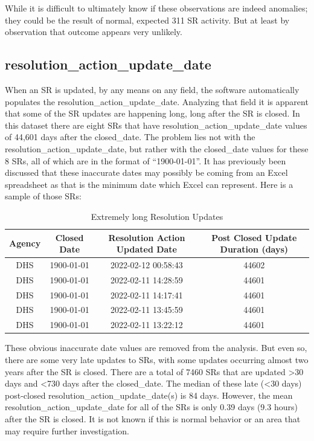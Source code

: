 \documentclass[12pt, titlepage]{article}
\begin{document}
	While it is difficult to ultimately know if these observations 
	are indeed anomalies; they could be the result of normal, 
	expected 311 SR activity. But at least by observation that 
	outcome appears very unlikely.	
		
\subsection{resolution\_action\_update\_date}
\label{sec: resolutionaction}
	When an SR is updated, by any means on any field, the software 
	automatically populates the resolution\_action\_update\_date. 
	Analyzing that field it is apparent that some of the SR updates 
	are happening long, long after the SR is closed. In this dataset 
	there are eight SRs that have resolution\_action\_update\_date values 
	of 44,601 days after the closed\_date. The problem lies not with 
	the  resolution\_action\_update\_date, but rather with the closed\_date 
	values for these 8 SRs, all of which are in the format of ``1900-01-01''. 
	It has previously been discussed that these inaccurate dates may 
	possibly be coming from an Excel spreadsheet as that is the minimum 
	date which Excel can represent. Here is a sample of those SRs:

	\begin{table}[tbp]
	    \centering
	    \caption{Extremely long Resolution Updates}
		    \begin{tabular}{cccc}
		        \hline
		        Agency & Closed Date & Resolution Action Updated Date 
		        & Post Closed Update Duration (days) \\
		        \hline
		        DHS & 1900-01-01 & 2022-02-12 00:58:43 & 44602 \\
		        DHS & 1900-01-01 & 2022-02-11 14:28:59 & 44601 \\
		        DHS & 1900-01-01 & 2022-02-11 14:17:41 & 44601 \\
		        DHS & 1900-01-01 & 2022-02-11 13:45:59 & 44601 \\
		        DHS & 1900-01-01 & 2022-02-11 13:22:12 & 44601 \\
		        \hline
		    \end{tabular}
	    \label{tab:resolution-updates}
	\end{table}
	
	These obvious inaccurate date values are removed from the analysis. 
	But even so, there are some very late updates to SRs, with some 
	updates occurring almost two years after the SR is closed. There are a 
	total of 7460 SRs that are updated \textgreater30 days and \textless{}730 
	days after the closed\_date. The median of these late 
	(\textless{}30 days) post-closed resolution\_action\_update\_date(s) is 
	84 days. However, the mean resolution\_action\_update\_date for 
	all of the SRs is only 0.39 days (9.3 hours) after the SR is closed. 
	It is not known if this is normal behavior or an area that may 
	require further investigation. 
	
\end{document}
